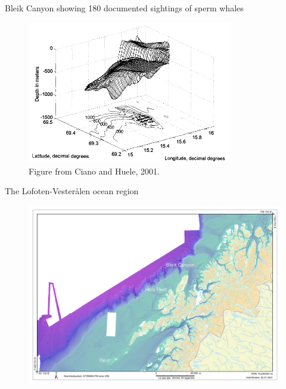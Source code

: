 \documentclass{beamer}
\begin{document}
\begin{frame}{Bleik Canyon showing 180 documented sightings of sperm whales}
    \begin{figure}
    \centering
    \includegraphics[width = 0.8\textwidth]{figures/whalesitings_bleikdjupet.pdf}
    \caption{Figure from Ciano and Huele, 2001.} %
\end{figure}
\end{frame}

\begin{frame}{The Lofoten-Vesterålen ocean region}
\begin{figure}
    \centering
    \includegraphics[width=\linewidth]{figures/dybdedata_stor_stedsnavn.pdf}
\end{figure}
\end{frame}
\end{document}

